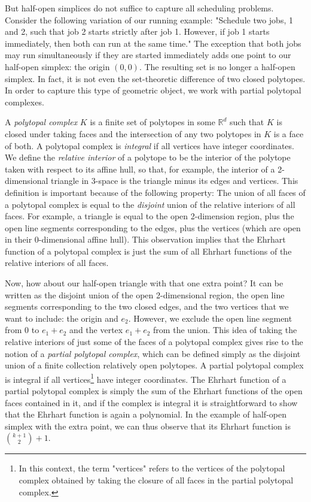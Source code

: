 \documentclass[12pt,reqno]{amsart}
\numberwithin{definition}{section}
\newcommand{\RR}{\mathbb{R}}
\begin{document}
But half-open simplices do not suffice to capture all scheduling problems. Consider the following variation of our running example: "Schedule two jobs, 1 and 2, such that job 2 starts strictly after job 1. However, if job 1 starts immediately, then both can run at the same time." The exception that both jobs may run simultaneously if they are started immediately adds one point to our half-open simplex: the origin $(0,0)$. The resulting set is no longer a half-open simplex. In fact, it is not even the set-theoretic difference of two closed polytopes. In order to capture this type of geometric object, we work with partial polytopal complexes.

A \emph{polytopal complex} $K$ is a finite set of polytopes in some $\RR^d$ such that $K$ is closed under taking faces and the intersection of any two polytopes in $K$ is a face of both. A polytopal complex is \emph{integral} if all vertices have integer coordinates. We define the \emph{relative interior} of a polytope to be the interior of the polytope taken with respect to its affine hull, so that, for example, the interior of a 2-dimensional triangle in 3-space is the triangle minus its edges and vertices. This definition is important because of the following property: The union of all faces of a polytopal complex is equal to the \emph{disjoint} union of the relative interiors of all faces. For example, a triangle is equal to the open 2-dimension region, plus the open line segments corresponding to the edges, plus the vertices (which are open in their 0-dimensional affine hull). This observation implies that the Ehrhart function of a polytopal complex is just the sum of all Ehrhart functions of the relative interiors of all faces.

Now, how about our half-open triangle with that one extra point? It can be written as the disjoint union of the open 2-dimensional region, the open line segments corresponding to the two closed edges, and the two vertices that we want to include: the origin and $e_2$. However, we exclude the open line segment from 0 to $e_1+e_2$ and the vertex $e_1+e_2$ from the union. This idea of taking the relative interiors of just some of the faces of a polytopal complex gives rise to the notion of a \emph{partial polytopal complex}, which can be defined simply as the disjoint union of a finite collection relatively open polytopes. A partial polytopal complex is integral if all vertices\footnote{In this context, the term "vertices" refers to the vertices of the polytopal complex obtained by taking the closure of all faces in the partial polytopal complex.} have integer coordinates. The Ehrhart function of a partial polytopal complex is simply the sum of the Ehrhart functions of the open faces contained in it, and if the complex is integral it is straightforward to show that the Ehrhart function is again a polynomial. In the example of half-open simplex with the extra point, we can thus observe that its Ehrhart function is $\binom{k+1}{2} + 1$.
\end{document}
